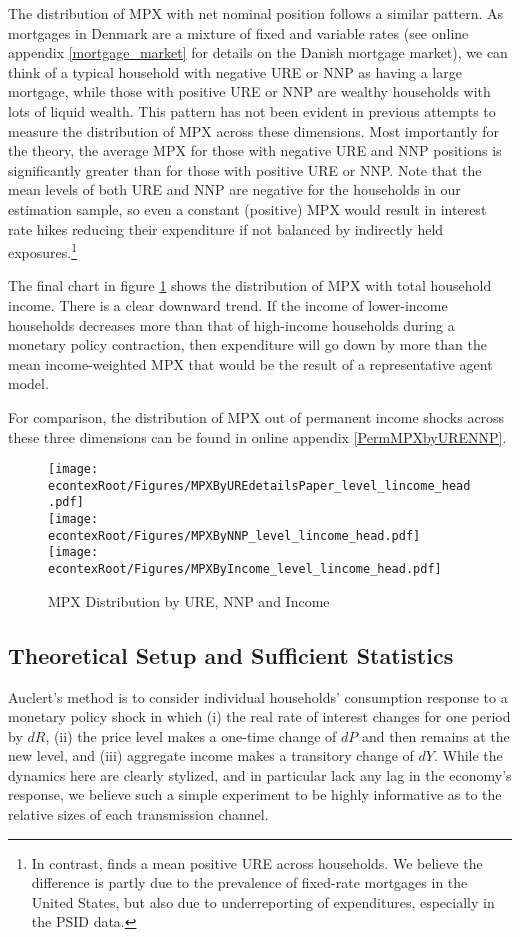 \documentclass[titlepage]{\econtex}\newcommand{\texname}{ConsumptionHeterogeneity}
\begin{document}
The distribution of MPX with net nominal position follows a similar pattern. As mortgages in Denmark are a mixture of fixed and variable rates (see online appendix \ref{mortgage_market} for details on the Danish mortgage market), we can think of a typical household with negative URE or NNP as having a large mortgage, while those with positive URE or NNP are wealthy households with lots of liquid wealth. This pattern has not been evident in previous attempts to measure the distribution of MPX across these dimensions. Most importantly for the theory, the average MPX for those with negative URE and NNP positions is significantly greater than for those with positive URE or NNP. Note that the mean levels of both URE and NNP are negative for the households in our estimation sample, so even a constant (positive) MPX would result in interest rate hikes reducing their expenditure if not balanced by indirectly held exposures.\footnote{In contrast, \cite{auclert_monetary_2017} finds a mean positive URE across households. We believe the difference is partly due to the prevalence of fixed-rate mortgages in the United States, but also due to underreporting of expenditures, especially in the PSID data.}

The final chart in figure \ref{fig:MPCAuclert} shows the distribution of MPX with total household income. There is a clear downward trend. If the income of lower-income households decreases more than that of high-income households during a monetary policy contraction, then expenditure will go down by more than the mean income-weighted MPX that would be the result of a representative agent model.

For comparison, the distribution of  MPX out of permanent income shocks across these three dimensions can be found in online appendix \ref{PermMPXbyURENNP}.
\begin{figure} 
\begin{centering}
	\texttt{[image: \\econtexRoot/Figures/MPXByUREdetailsPaper\_level\_lincome\_head.pdf]} \\
	\texttt{[image: \\econtexRoot/Figures/MPXByNNP\_level\_lincome\_head.pdf]}
	\texttt{[image: \\econtexRoot/Figures/MPXByIncome\_level\_lincome\_head.pdf]}
	\caption{MPX Distribution by URE, NNP and Income}
	\label{fig:MPCAuclert}
\end{centering}
\end{figure}

\subsection{Theoretical Setup and Sufficient Statistics}
Auclert's method is to consider individual households' consumption response to a monetary policy shock in which (i) the real rate of interest changes for one period by $dR$, (ii) the price level makes a one-time change of $dP$ and then remains at the new level, and (iii) aggregate income makes a transitory change of $dY$. While the dynamics here are clearly stylized, and in particular lack any lag in the economy's response, we believe such a simple experiment to be highly informative as to the relative sizes of each transmission channel.
\end{document}

